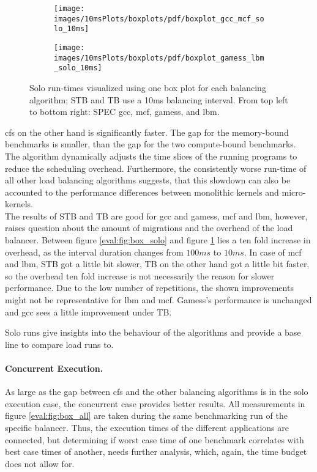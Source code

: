 \begin{figure}[!ht]
  \begin{subfigure}{\textwidth}
  \texttt{[image: images/10msPlots/boxplots/pdf/boxplot\_gcc\_mcf\_solo\_10ms]}
  \end{subfigure}
  \begin{subfigure}{\textwidth}
  \texttt{[image: images/10msPlots/boxplots/pdf/boxplot\_gamess\_lbm\_solo\_10ms]}
  \end{subfigure}
  \caption{Solo run-times visualized using one box plot for each balancing
    algorithm; STB and TB use a 10ms balancing interval.
    From top left to bottom right: SPEC gcc, mcf, gamess, and lbm.}
  \label{eval:fig:box_solo_10ms}
\end{figure}


\Gls{cfs} on the other hand is significantly faster.
The gap for the memory-bound benchmarks is smaller, than the gap for
the two compute-bound benchmarks.
The algorithm dynamically adjusts the time slices of the running programs to reduce
the scheduling overhead.
Furthermore, the consistently worse run-time of all other load balancing
algorithms suggests, that this slowdown can also be accounted to the performance
differences between monolithic kernels and micro-kernels.
\\

The results of STB and TB are good for gcc and gamess, mcf and lbm, however,
raises question about the amount of migrations and the overhead of the load
balancer.
Between figure \ref{eval:fig:box_solo} and figure \ref{eval:fig:box_solo_10ms}
lies a ten fold increase in overhead, as the interval duration changes from
$100ms$ to $10ms$.
In case of mcf and lbm, STB got a little bit slower, TB on the other hand got a
little bit faster, so the overhead ten fold increase is not necessarily the
reason for slower performance.
Due to the low number of repetitions, the shown improvements might not be
representative for lbm and mcf.
Gamess's performance is unchanged and gcc sees a little improvement under TB.

Solo runs give insights into the behaviour of the algorithms and provide
a base line to compare load runs to.


\paragraph{Concurrent Execution.}
As large as the gap between \gls{cfs} and the other balancing algorithms is in
the solo execution case, the concurrent case provides better results.
All measurements in figure \ref{eval:fig:box_all} are taken during the same
benchmarking run of the specific balancer.
Thus, the execution times of the different applications are connected, but
determining if worst case time of one benchmark correlates with best case times
of another, needs further analysis, which, again, the time budget does not
allow for.


